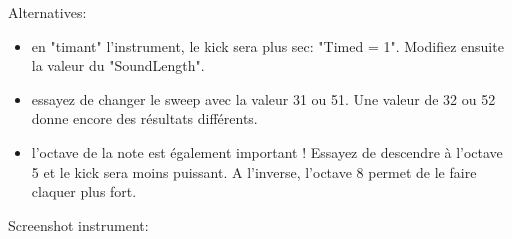 \documentclass[12pt,a4paper]{article}
\begin{document}
    Alternatives:
    \begin{itemize}
    \item{en "timant" l'instrument, le kick sera plus sec: "Timed = 1". Modifiez ensuite la valeur du "SoundLength".}
    \item{essayez de changer le sweep avec la valeur 31 ou 51. Une valeur de 32 ou 52 donne encore des résultats différents.}
    \item{l'octave de la note est également important ! Essayez de descendre à l'octave 5 et le kick sera moins puissant. A l'inverse, l'octave 8 permet de le faire claquer plus fort.}
    \end{itemize}\medskip
    
    Screenshot instrument:
	
\end{document}
